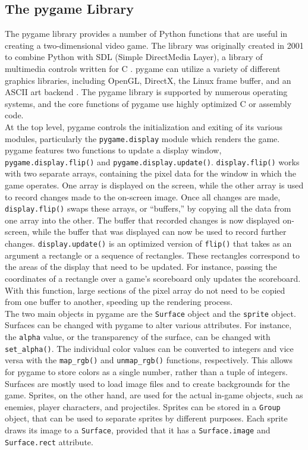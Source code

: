 \subsection{The pygame Library}
The pygame library provides a number of Python functions that are useful in creating a two-dimensional video game. The library was originally created in 2001 to combine Python with SDL (Simple DirectMedia Layer), a library of multimedia controls written for C \cite{shinners}. pygame can utilize a variety of different graphics libraries, including OpenGL, DirectX, the Linux frame buffer, and an ASCII art backend \cite{shinners}. The pygame library is supported by numerous operating systems, and the core functions of pygame use highly optimized C or assembly code.\\

At the top level, pygame controls the initialization and exiting of its various modules, particularly the \texttt{pygame.display} module which renders the game. pygame features two functions to update a display window, \texttt{pygame.display.flip()} and \texttt{pygame.display.update()}. \texttt{display.flip()} works with two separate arrays, containing the pixel data for the window in which the game operates. One array is displayed on the screen, while the other array is used to record changes made to the on-screen image. Once all changes are made, \texttt{display.flip()} swaps these arrays, or ``buffers,'' by copying all the data from one array into the other. The buffer that recorded changes is now displayed on-screen, while the buffer that was displayed can now be used to record further changes. \texttt{display.update()} is an optimized version of \texttt{flip()} that takes as an argument a rectangle or a sequence of rectangles. These rectangles correspond to the areas of the display that need to be updated. For instance, passing the coordinates of a rectangle over a game's scoreboard only updates the scoreboard. With this function, large sections of the pixel array do not need to be copied from one buffer to another, speeding up the rendering process.\\

The two main objects in pygame are the \texttt{Surface} object and the \texttt{sprite} object. Surfaces can be changed with pygame to alter various attributes. For instance, the \texttt{alpha} value, or the transparency of the surface, can be changed with \texttt{set\_alpha()}. The individual color values can be converted to integers and vice versa with the \texttt{map\_rgb()} and \texttt{unmap\_rgb()} functions, respectively. This allows for pygame to store colors as a single number, rather than a tuple of integers. Surfaces are mostly used to load image files and to create backgrounds for the game. Sprites, on the other hand, are used for the actual in-game objects, such as enemies, player characters, and projectiles. Sprites can be stored in a \texttt{Group} object, that can be used to separate sprites by different purposes. Each sprite draws its image to a \texttt{Surface}, provided that it has a \texttt{Surface.image} and \texttt{Surface.rect} attribute.\\

